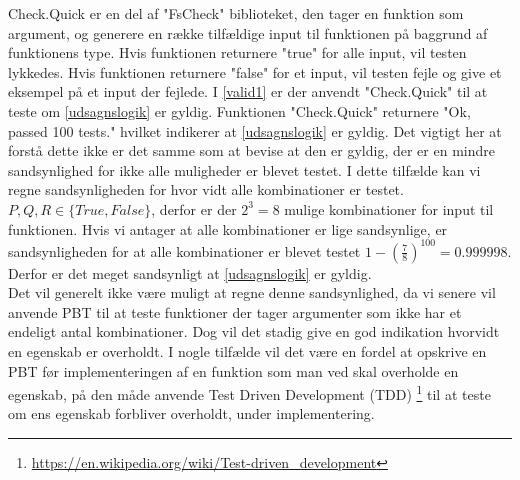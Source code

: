 Check.Quick er en del af "FsCheck" biblioteket, den tager en funktion som argument, og generere en række tilfældige input til funktionen på baggrund af funktionens type. Hvis funktionen returnere "true" for alle input, vil testen lykkedes. Hvis funktionen returnere "false" for et input, vil testen fejle og give et eksempel på et input der fejlede. I \ref{valid1} er der anvendt "Check.Quick" til at teste om \ref{udsagnslogik} er gyldig. Funktionen "Check.Quick" returnere "Ok, passed 100 tests." hvilket indikerer at \ref{udsagnslogik} er gyldig. Det vigtigt her at forstå dette ikke er det samme som at bevise at den er gyldig, der er en mindre sandsynlighed for ikke alle muligheder er blevet testet. I dette tilfælde kan vi regne sandsynligheden for hvor vidt alle kombinationer er testet. $P, Q, R \in \{True, False\}$, derfor er der $2^3 = 8$ mulige kombinationer for input til funktionen. Hvis vi antager at alle kombinationer er lige sandsynlige, er sandsynligheden for at alle kombinationer er blevet testet $1 - (\frac{7}{8})^{100} = 0.999998$. Derfor er det meget sandsynligt at \ref{udsagnslogik} er gyldig.\\
Det vil generelt ikke være muligt at regne denne sandsynlighed, da vi senere vil anvende PBT til at teste funktioner der tager argumenter som ikke har et endeligt antal kombinationer. Dog vil det stadig give en god indikation hvorvidt en egenskab er overholdt. I nogle tilfælde vil det være en fordel at opskrive en PBT før implementeringen af en funktion som man ved skal overholde en egenskab, på den måde anvende Test Driven Development (TDD) \footnote{\url{https://en.wikipedia.org/wiki/Test-driven_development}} til at teste om ens egenskab forbliver overholdt, under implementering.
